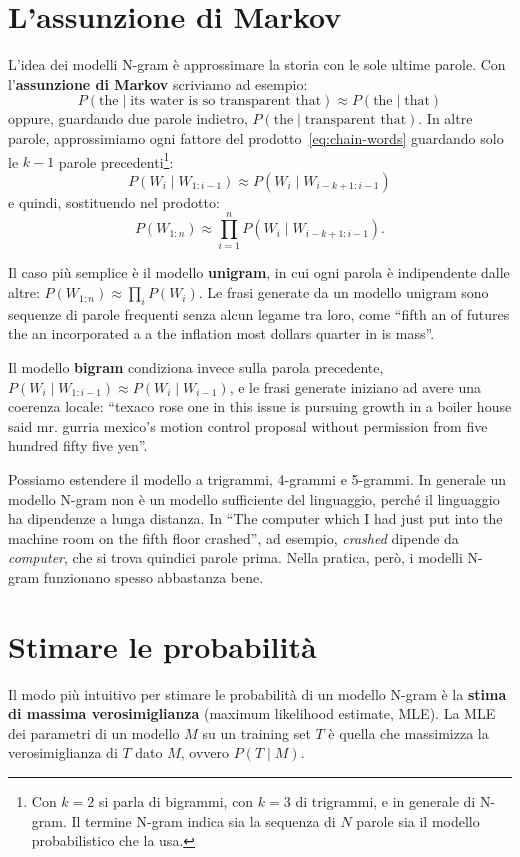 \section{L'assunzione di Markov}
L'idea dei modelli N-gram è approssimare la storia con le sole ultime parole. Con l'\textbf{assunzione di Markov} scriviamo ad esempio:
\[
P(\text{the} \mid \text{its water is so transparent that}) \approx P(\text{the} \mid \text{that})
\]
oppure, guardando due parole indietro, $P(\text{the} \mid \text{transparent that})$. In altre parole, approssimiamo ogni fattore del prodotto~\eqref{eq:chain-words} guardando solo le $k-1$ parole precedenti\footnote{Con $k = 2$ si parla di bigrammi, con $k = 3$ di trigrammi, e in generale di N-gram. Il termine N-gram indica sia la sequenza di $N$ parole sia il modello probabilistico che la usa.}:
\begin{equation}
P(W_i \mid W_{1:i-1}) \approx P(W_i \mid W_{i-k+1:i-1})
\end{equation}
e quindi, sostituendo nel prodotto:
\begin{equation}
P(W_{1:n}) \approx \prod_{i=1}^{n} P(W_i \mid W_{i-k+1:i-1}).
\end{equation}

Il caso più semplice è il modello \textbf{unigram}, in cui ogni parola è indipendente dalle altre: $P(W_{1:n}) \approx \prod_i P(W_i)$. Le frasi generate da un modello unigram sono sequenze di parole frequenti senza alcun legame tra loro, come \enquote{fifth an of futures the an incorporated a a the inflation most dollars quarter in is mass}.

Il modello \textbf{bigram} condiziona invece sulla parola precedente, $P(W_i \mid W_{1:i-1}) \approx P(W_i \mid W_{i-1})$, e le frasi generate iniziano ad avere una coerenza locale: \enquote{texaco rose one in this issue is pursuing growth in a boiler house said mr. gurria mexico's motion control proposal without permission from five hundred fifty five yen}.

Possiamo estendere il modello a trigrammi, 4-grammi e 5-grammi. In generale un modello N-gram non è un modello sufficiente del linguaggio, perché il linguaggio ha dipendenze a lunga distanza. In \enquote{The computer which I had just put into the machine room on the fifth floor crashed}, ad esempio, \textit{crashed} dipende da \textit{computer}, che si trova quindici parole prima. Nella pratica, però, i modelli N-gram funzionano spesso abbastanza bene.

\section{Stimare le probabilità}
Il modo più intuitivo per stimare le probabilità di un modello N-gram è la \textbf{stima di massima verosimiglianza} (maximum likelihood estimate, MLE). La MLE dei parametri di un modello $M$ su un training set $T$ è quella che massimizza la verosimiglianza di $T$ dato $M$, ovvero $P(T \mid M)$.


